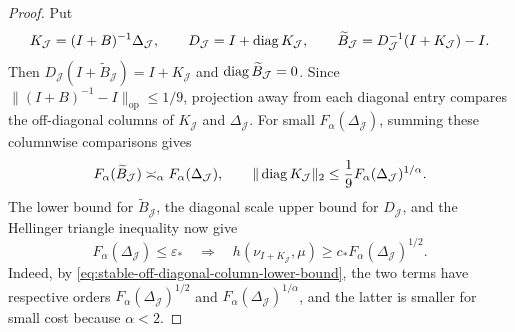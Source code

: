 \begin{proof}
Put
\[
 K_{\mathcal J}=(I+B)^{-1}\Delta_{\mathcal J},
 \qquad
 D_{\mathcal J}=I+\operatorname{diag} K_{\mathcal J},
 \qquad
 \widetilde B_{\mathcal J}=D_{\mathcal J}^{-1}(I+K_{\mathcal J})-I.
\]
Then \(D_{\mathcal J}(I+\widetilde B_{\mathcal J})=I+K_{\mathcal J}\) and
\(\operatorname{diag}\widetilde B_{\mathcal J}=0\).  Since
\(\|(I+B)^{-1}-I\|_{\mathrm{op}}\le1/9\), projection away from each diagonal
entry compares the off-diagonal columns of \(K_{\mathcal J}\) and
\(\Delta_{\mathcal J}\).  For small \(F_\alpha(\Delta_{\mathcal J})\), summing
these columnwise comparisons gives
\[
 F_\alpha(\widetilde B_{\mathcal J})\asymp_\alpha F_\alpha(\Delta_{\mathcal J}),
 \qquad
 \|\operatorname{diag} K_{\mathcal J}\|_2
 \le\frac19F_\alpha(\Delta_{\mathcal J})^{1/\alpha}.
\]
The lower bound for \(\widetilde B_{\mathcal J}\), the diagonal scale upper
bound for \(D_{\mathcal J}\), and the Hellinger triangle inequality now give
\begin{equation}
 F_\alpha(\Delta_{\mathcal J})\le\varepsilon_*
 \quad\Longrightarrow\quad
 h(\nu_{I+K_{\mathcal J}},\mu)
 \ge c_*F_\alpha(\Delta_{\mathcal J})^{1/2}.
 \label{eq:stable-finite-cut-lower-bound}
\end{equation}
Indeed, by \eqref{eq:stable-off-diagonal-column-lower-bound}, the two terms
have respective orders
\(F_\alpha(\Delta_{\mathcal J})^{1/2}\) and
\(F_\alpha(\Delta_{\mathcal J})^{1/\alpha}\), and the latter is smaller for small
cost because \(\alpha<2\).


\end{proof}
